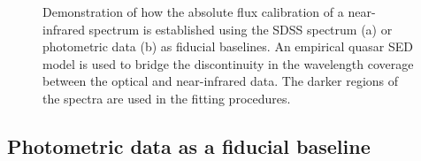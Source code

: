 \begin{figure}
    \captionsetup[subfigure]{labelformat=empty}
    \centering
    \subfloat[\label{fig:normalise_to_sdss_a}]{}
    \subfloat[\label{fig:normalise_to_sdss_b}]{}    
    \caption[{Demonstration of absolute flux calibration of near-infrared spectra.}]{Demonstration of how the absolute flux calibration of a near-infrared spectrum is established using the SDSS spectrum (a) or photometric data (b) as fiducial baselines. An empirical quasar SED model is used to bridge the discontinuity in the wavelength coverage between the optical and near-infrared data. The darker regions of the spectra are used in the fitting procedures.}     
    \label{fig:normalise_to_sdss}
\end{figure}

\subsection{Photometric data as a fiducial baseline}

